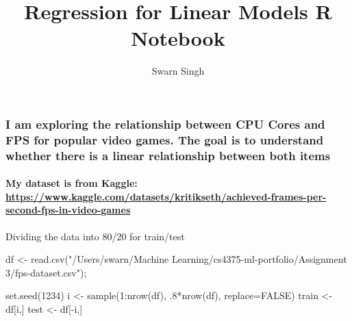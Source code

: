 \documentclass[
]{article}
\title{Regression for Linear Models R Notebook}
\author{Swarn Singh}
\date{}
\newenvironment{Shaded}{\begin{snugshade}}{\end{snugshade}}
\newcommand{\AttributeTok}[1]{\textcolor[rgb]{0.77,0.63,0.00}{#1}}
\newcommand{\ConstantTok}[1]{\textcolor[rgb]{0.00,0.00,0.00}{#1}}
\newcommand{\DecValTok}[1]{\textcolor[rgb]{0.00,0.00,0.81}{#1}}
\newcommand{\FunctionTok}[1]{\textcolor[rgb]{0.00,0.00,0.00}{#1}}
\newcommand{\NormalTok}[1]{#1}
\newcommand{\OtherTok}[1]{\textcolor[rgb]{0.56,0.35,0.01}{#1}}
\newcommand{\SpecialCharTok}[1]{\textcolor[rgb]{0.00,0.00,0.00}{#1}}
\newcommand{\StringTok}[1]{\textcolor[rgb]{0.31,0.60,0.02}{#1}}
\begin{document}
\maketitle

\hypertarget{i-am-exploring-the-relationship-between-cpu-cores-and-fps-for-popular-video-games.-the-goal-is-to-understand-whether-there-is-a-linear-relationship-between-both-items}{%
\subsubsection{I am exploring the relationship between CPU Cores and FPS
for popular video games. The goal is to understand whether there is a
linear relationship between both
items}\label{i-am-exploring-the-relationship-between-cpu-cores-and-fps-for-popular-video-games.-the-goal-is-to-understand-whether-there-is-a-linear-relationship-between-both-items}}

\hypertarget{my-dataset-is-from-kaggle-httpswww.kaggle.comdatasetskritiksethachieved-frames-per-second-fps-in-video-games}{%
\paragraph{\texorpdfstring{My dataset is from Kaggle:
\url{https://www.kaggle.com/datasets/kritikseth/achieved-frames-per-second-fps-in-video-games}}{My dataset is from Kaggle: https://www.kaggle.com/datasets/kritikseth/achieved-frames-per-second-fps-in-video-games}}\label{my-dataset-is-from-kaggle-httpswww.kaggle.comdatasetskritiksethachieved-frames-per-second-fps-in-video-games}}

Dividing the data into 80/20 for train/test

\begin{Shaded}
\begin{Highlighting}[]
\NormalTok{df }\OtherTok{\textless{}{-}} \FunctionTok{read.csv}\NormalTok{(}\StringTok{"/Users/swarn/Machine Learning/cs4375{-}ml{-}portfolio/Assignment 3/fps{-}dataset.csv"}\NormalTok{);}

\FunctionTok{set.seed}\NormalTok{(}\DecValTok{1234}\NormalTok{)}
\NormalTok{i }\OtherTok{\textless{}{-}} \FunctionTok{sample}\NormalTok{(}\DecValTok{1}\SpecialCharTok{:}\FunctionTok{nrow}\NormalTok{(df), .}\DecValTok{8}\SpecialCharTok{*}\FunctionTok{nrow}\NormalTok{(df), }\AttributeTok{replace=}\ConstantTok{FALSE}\NormalTok{)}
\NormalTok{train }\OtherTok{\textless{}{-}}\NormalTok{ df[i,]}
\NormalTok{test }\OtherTok{\textless{}{-}}\NormalTok{ df[}\SpecialCharTok{{-}}\NormalTok{i,]}
\end{Highlighting}
\end{Shaded}
\end{document}
